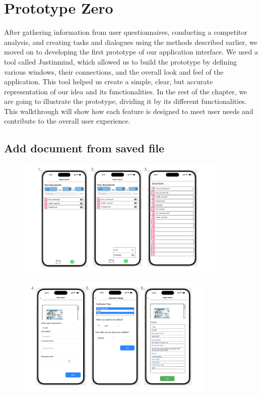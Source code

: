 \section{Prototype Zero}
After gathering information from user questionnaires, conducting a competitor analysis, and creating tasks and dialogues using the methods described earlier, we moved on to developing the first prototype of our application interface. We used a tool called Justinmind, which allowed us to build the prototype by defining various windows, their connections, and the overall look and feel of the application. This tool helped us create a simple, clear, but accurate representation of our idea and its functionalities.
In the rest of the chapter, we are going to illustrate the prototype, dividing it by its different functionalities. This walkthrough will show how each feature is designed to meet user needs and contribute to the overall user experience.
	\subsection{Add document from saved file}

		\begin{figure}[htbp]
			\centering
			\includegraphics[width=0.9\textwidth]{../mockups/add_doc_pdf_1.png}  %
		\end{figure}
		
		\begin{figure}[htbp]
			\centering
			\includegraphics[width=0.85\textwidth]{../mockups/add_doc_pdf_2.png}  %
		\end{figure}
		\clearpage
